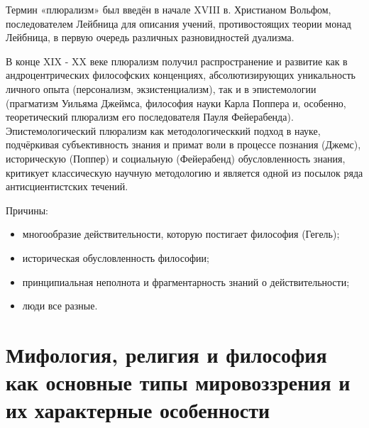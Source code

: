\documentclass[12pt]{article}
\begin{document}
Термин «плюрализм» был введён в начале XVIII в. Христианом Вольфом, последователем Лейбница для
описания учений, противостоящих теории монад Лейбница, в первую очередь различных разновидностей
дуализма.

В конце XIX - XX веке плюрализм получил распространение и развитие как в андроцентрических философских
конценциях, абсолютизирующих уникальность личного опыта (персонализм, экзистенциализм), так и в
эпистемологии (прагматизм Уильяма Джеймса, философия науки Карла Поппера и, особенно, теоретический
плюрализм его последователя Пауля Фейерабенда).
Эпистемологический плюрализм как методологическкий подход в науке, подчёркивая субъективность знания и
примат воли в процессе познания (Джемс), историческую (Поппер) и социальную (Фейерабенд)
обусловленность знания, критикует классическую научную методологию и является одной из посылок ряда
антисциентистских течений.

Причины:
\begin{itemize}
\item многообразие действительности, которую постигает философия (Гегель);
\item историческая обусловленность философии;
\item принципиальная неполнота и фрагментарность знаний о действительности;
\item люди все разные.
\end{itemize}


\newpage
\section{Мифология, религия и философия как основные типы мировоззрения и их характерные особенности}
\end{document}
